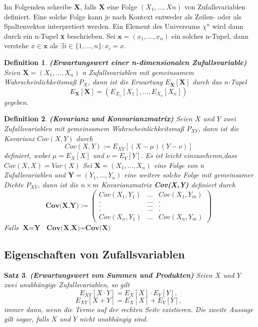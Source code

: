 \documentclass[12pt,a4paper]{scrartcl}
\newtheorem{Satz}{Satz}[section]
\newtheorem{Definition}[Satz]{Definition}
\numberwithin{equation}{section}
\begin{document}
  Im Folgenden schreibe \textbf{X}, falls \textbf{X} eine Folge $(X_{1},...,X{n})$ von Zufallsvariablen
  definiert. Eine solche Folge kann je nach Kontext entweder als Zeilen- oder als Spaltenvektor interpretiert 
  werden. Ein Element des Universums $\chi^{n}$ wird dann durch ein n-Tupel \textbf{x} beschrieben.
  Sei $\textbf{x} = (x_{1},...,x_{n})$ ein solches n-Tupel, dann verstehe $x \in \textbf{x}$
  als $\exists i \in \textit{\{} 1,...,n \textit{\}}: x_{i} = x$. 

\begin{Definition}\textbf{(Erwartungswert einer n-dimensionalen Zufallsvariable)}
 Seien $\textbf{X} = (X_{1},...,X_{n})$ n Zufallsvariablen mit gemeinsamem Wahrscheinlichkeitsmaß $P_{X}$, 
 dann ist die Erwartung $E_{\textbf{X}}[\textbf{X}]$ durch das n-Tupel
 $$
 E_{\textbf{X}}[\textbf{X}] = (E_{X_{1}}[X_{1}],...,E_{X_{n}}[X_{n}])
 $$
 gegeben.
\end{Definition}

\begin{Definition}\textbf{(Kovarianz und Konvarianzmatrix)}
 Seien $X$ und $Y$ zwei Zufallsvariablen mit gemeinsamem Wahrscheinlichkeitsmaß $P_{XY}$,
 dann ist die Kovarianz $Cov(X,Y)$ durch 
 $$
 Cov(X,Y) := E_{XY}[(X-\mu)(Y-\nu)]
 $$
 definiert, wobei $\mu = E_{X}[X]$ und $\nu = E_{Y}[Y]$. Es ist leicht einzusehemn,dass $Cov(X,X) = Var(X)$
 Sei $\textbf{X} = (X_{1},...,X_{n})$ eine Folge von n Zufallsvariablen und $\textbf{Y} = (Y_{1},...,Y_{n})$
 eine weitere solche Folge mit gemeinsamer Dichte $P_{XY}$, dann ist die $n \times m$ Kovarianzmatrix
 \textbf{Cov(X,Y)} definiert durch
 $$
 \textbf{Cov(X,Y)} := 
 \begin{pmatrix}
  Cov(X_{1},Y_{1}) 	& ... 	& Cov(X_{1},Y_{m})  	\\
  . 			& ... 	& .  			\\
  . 			& ... 	& .			\\
  . 			& ... 	& .		  	\\
  Cov(X_{n},Y_{1}) 	& ...	& Cov(X_{n},Y_{m}) 
 \end{pmatrix}
 $$
 Falls $\textbf{X} = \textbf{Y}$ $\textbf{Cov(X,X)} = \textbf{Cov(X)}$
 \end{Definition}
 
 \subsection{Eigenschaften von Zufallsvariablen}
 
 \begin{Satz}\textbf{(Erwartungswert von Summen und Produkten)}
  Seien $X$ und $Y$ zwei unabhängige Zufallsvariablen, so gilt
  \begin{equation}
  E_{XY}[X \cdot Y] = E_{X}[X] \cdot E_{Y}[Y], 
  \end{equation}
\begin{equation}
  E_{XY}[X + Y] = E_{X}[X] + E_{Y}[Y], 
  \end{equation}
  immer dann, wenn die Terme auf der rechten Seite existieren. Die zweite Aussage gilt sogar, falls
  $X$ und $Y$ nicht unabhängig sind. 
 \end{Satz}
\end{document}

